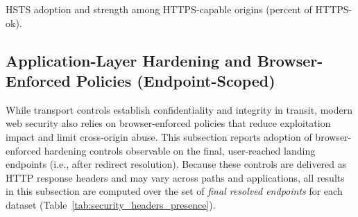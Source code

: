 \documentclass[a4paper,fleqn]{cas-sc}
\begin{document}
\begin{table}[t]
  \caption{HSTS adoption and strength among HTTPS-capable origins (percent of HTTPS-ok).}
  \label{tab:https_hsts_quality}
  \centering
  \scriptsize
  \setlength{\tabcolsep}{3.5pt}
  \renewcommand{\arraystretch}{1.15}

  \begin{adjustbox}{max width=\columnwidth}
  \end{adjustbox}
\end{table} 


\subsection{Application-Layer Hardening and Browser-Enforced Policies (Endpoint-Scoped)}
\label{sec:app_layer_hardening}
    While transport controls establish confidentiality and integrity in transit, modern web security also relies on browser-enforced policies that reduce exploitation impact and limit cross-origin abuse.
    This subsection reports adoption of browser-enforced hardening controls observable on the final, user-reached landing endpoints (i.e., after redirect resolution). 
    Because these controls are delivered as HTTP response headers and may vary across paths and applications, all results in this subsection are computed over the set of \emph{final resolved endpoints} for each dataset (Table~\ref{tab:security_headers_presence}). 
\end{document}
